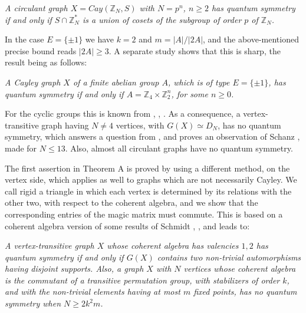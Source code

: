 \documentclass[11pt]{amsart}
\newcommand{\Z}{\mathbb Z}
\begin{document}
\medskip

 {\em A circulant graph $X=Cay(\Z_N,S)$ with $N=p^n$, $n\geq2$ has quantum symmetry if and only if $S\cap\Z_N^*$ is a union of cosets of the subgroup of order $p$ of $\Z_N$.}

\medskip

In the case $E=\{\pm1\}$ we have $k=2$ and $m=|A|/|2A|$, and the above-mentioned precise bound reads $|2A|\geq3$. A separate study shows that this is sharp, the result being as follows:

\medskip

 {\em A Cayley graph $X$ of a finite abelian group $A$, which is of type $E=\{\pm1\}$, has quantum symmetry if and only if $A=\Z_4\times\Z_2^n$, for some $n\geq0$.}

\medskip

For the cyclic groups this is known from \cite{ba2}, \cite{bb}, \cite{lmr}. As a consequence, a vertex-transitive graph having $N\neq4$ vertices, with $G(X)\simeq D_N$, has no quantum symmetry, which answers a question from \cite{bb}, and proves an observation of Schanz \cite{scz}, made for $N\leq13$. Also, almost all circulant graphs have no quantum symmetry.

The first assertion in Theorem A is proved by using a different method, on the vertex side, which applies as well to graphs which are not necessarily Cayley. We call rigid a triangle in which each vertex is determined by its relations with the other two, with respect to the coherent algebra, and we show that the corresponding entries of the magic matrix must commute. This is based on a coherent algebra version of some results of Schmidt \cite{scd}, \cite{sc2}, and leads to:

\medskip

 {\em A vertex-transitive graph $X$ whose coherent algebra has valencies $1,2$ has quantum symmetry if and only if $G(X)$ contains two non-trivial automorphisms having disjoint supports. Also, a graph $X$ with $N$ vertices whose coherent algebra is the commutant of a transitive permutation group, with stabilizers of order $k$, and with the non-trivial elements having at most $m$ fixed points, has no quantum symmetry when $N\geq2k^2m$.}

\medskip
\end{document}
